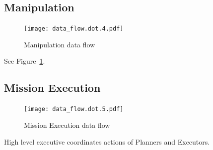 \documentclass[12pt]{article}
\begin{document}
\subsection{Manipulation}\label{Manipulation}
\begin{figure}[htbp]
\centering
\texttt{[image: data\_flow.dot.4.pdf]}
\caption{Manipulation data flow}
\label{fig_df_man}
\end{figure}
See Figure~\ref{fig_df_man}.



\subsection{Mission Execution}\label{MissionExecution}
\begin{figure}[htbp]
\centering
\texttt{[image: data\_flow.dot.5.pdf]}
\caption{Mission Execution data flow}
\label{fig_df_exec}
\end{figure}

High level executive coordinates actions of Planners and Executors.



\end{document}

